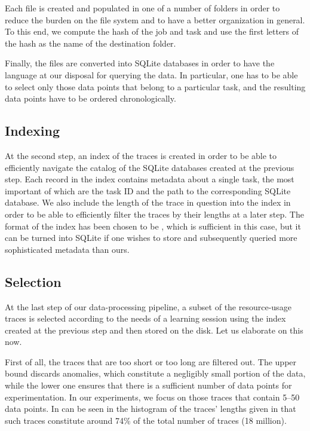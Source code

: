 Each  file is created and populated in one of a number of folders in
order to reduce the burden on the file system and to have a better organization
in general. To this end, we compute the  hash of the job and task
 and use the first letters of the hash as the name of the destination
folder.

Finally, the  files are converted into SQLite databases in order to have
the  language at our disposal for querying the data. In particular, one
has to be able to select only those data points that belong to a particular
task, and the resulting data points have to be ordered chronologically.

\subsection{Indexing} 
At the second step, an index of the traces is created in order to be able to
efficiently navigate the catalog of the SQLite databases created at the previous
step. Each record in the index contains metadata about a single task, the most
important of which are the task ID and the path to the corresponding SQLite
database. We also include the length of the trace in question into the index in
order to be able to efficiently filter the traces by their lengths at a later
step. The format of the index has been chosen to be , which is
sufficient in this case, but it can be turned into SQLite if one wishes to store
and subsequently queried more sophisticated metadata than ours.

\subsection{Selection}

At the last step of our data-processing pipeline, a subset of the resource-usage
traces is selected according to the needs of a learning session using the index
created at the previous step and then stored on the disk. Let us elaborate on
this now.

First of all, the traces that are too short or too long are filtered out. The
upper bound discards anomalies, which constitute a negligibly small portion of
the data, while the lower one ensures that there is a sufficient number of data
points for experimentation. In our experiments, we focus on those traces that
contain 5--50 data points. In can be seen in the histogram of the traces'
lengths given in  that such traces constitute around 74\% of the
total number of traces (18 million).

